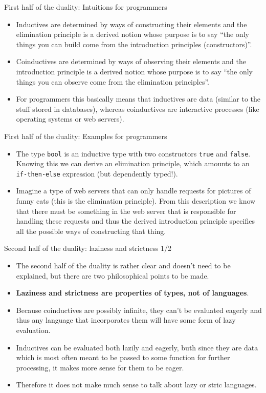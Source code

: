 \documentclass{beamer}
\begin{document}
\begin{frame}{First half of the duality: Intuitions for programmers}
\begin{itemize}
	\item Inductives are determined by ways of constructing their elements and the elimination principle is a derived notion whose purpose is to say ``the only things you can build come from the introduction principles (constructors)''.
	\item Coinductives are determined by ways of observing their elements and the introduction principle is a derived notion whose purpose is to say ``the only things you can observe come from the elimination principles''.
	\item For programmers this basically means that inductives are data (similar to the stuff stored in databases), whereas coinductives are interactive processes (like operating systems or web servers).
\end{itemize}
\end{frame}

\begin{frame}{First half of the duality: Examples for programmers}
\begin{itemize}
	\item The type \texttt{bool} is an inductive type with two constructors \texttt{true} and \texttt{false}. Knowing this we can derive an elimination principle, which amounts to an \texttt{if-then-else} expression (but dependently typed!).
	\item Imagine a type of web servers that can only handle requests for pictures of funny cats (this is the elimination principle). From this description we know that there must be something in the web server that is responsible for handling these requests and thus the derived introduction principle specifies all the possible ways of constructing that thing.
\end{itemize}
\end{frame}

\begin{frame}{Second half of the duality: laziness and strictness 1/2}
\begin{itemize}
	\item The second half of the duality is rather clear and doesn't need to be explained, but there are two philosophical points to be made. 
	\item \textbf{Laziness and strictness are properties of types, not of languages}.
	\item Because coinductives are possibly infinite, they can't be evaluated eagerly and thus any language that incorporates them will have some form of lazy evaluation.
	\item Inductives can be evaluated both lazily and eagerly, buth since they are data which is most often meant to be passed to some function for further processing, it makes more sense for them to be eager.
	\item Therefore it does not make much sense to talk about lazy or stric languages.
\end{itemize}
\end{frame}
\end{document}
